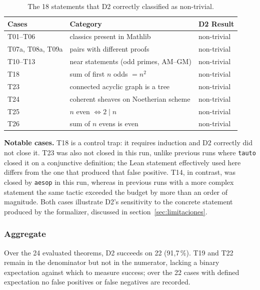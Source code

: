 \documentclass[12pt,a4paper]{article}
\theoremstyle{remark}
\begin{document}
\begin{table}[htbp]
\centering
\small
\setlength{\tabcolsep}{5pt}
\begin{tabular}{p{4.6cm}p{6.4cm}l}
\toprule
Cases & Category & D2 Result \\
\midrule
T01--T06                & classics present in Mathlib            & non-trivial \\
T07a, T08a, T09a        & pairs with different proofs          & non-trivial \\
T10--T13                & near statements (odd primes, AM--GM) & non-trivial \\
T18                     & sum of first $n$ odds $= n^2$ & non-trivial \\
T23                     & connected acyclic graph is a tree         & non-trivial \\
T24                     & coherent sheaves on Noetherian scheme & non-trivial \\
T25                     & $n$ even $\iff 2 \mid n$                  & non-trivial \\
T26                     & sum of $n$ evens is even                 & non-trivial \\
\bottomrule
\end{tabular}
\caption{The 18 statements that D2 correctly classified as non-trivial.}
\label{tab:d2notrivial}
\end{table}

\textbf{Notable cases.} T18 is a control trap: it requires induction and D2 correctly did not close it. T23 was also not closed in this run, unlike previous runs where \texttt{tauto} closed it on a conjunctive definition; the Lean statement effectively used here differs from the one that produced that false positive. T14, in contrast, was closed by \texttt{aesop} in this run, whereas in previous runs with a more complex statement the same tactic exceeded the budget by more than an order of magnitude. Both cases illustrate D2's sensitivity to the concrete statement produced by the formalizer, discussed in section~\ref{sec:limitaciones}.

\subsubsection*{Aggregate}

Over the 24 evaluated theorems, D2 succeeds on 22 (91{,}7\,\%). T19 and T22 remain in the denominator but not in the numerator, lacking a binary expectation against which to measure success; over the 22 cases with defined expectation no false positives or false negatives are recorded.
\end{document}
